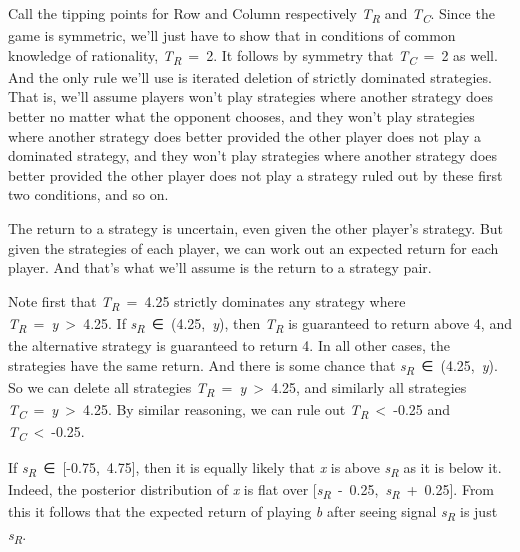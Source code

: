 \documentclass[
  11pt,
  letterpaper,
  DIV=11,
  numbers=noendperiod,
  twoside]{scrartcl}
\begin{document}
Call the tipping points for Row and Column respectively
\emph{T\textsubscript{R}} and \emph{T\textsubscript{C}}. Since the game
is symmetric, we'll just have to show that in conditions of common
knowledge of rationality, \emph{T\textsubscript{R}}~=~2. It follows by
symmetry that \emph{T\textsubscript{C}}~=~2 as well. And the only rule
we'll use is iterated deletion of strictly dominated strategies. That
is, we'll assume players won't play strategies where another strategy
does better no matter what the opponent chooses, and they won't play
strategies where another strategy does better provided the other player
does not play a dominated strategy, and they won't play strategies where
another strategy does better provided the other player does not play a
strategy ruled out by these first two conditions, and so on.

The return to a strategy is uncertain, even given the other player's
strategy. But given the strategies of each player, we can work out an
expected return for each player. And that's what we'll assume is the
return to a strategy pair.

Note first that \emph{T\textsubscript{R}}~=~4.25 strictly dominates any
strategy where \emph{T\textsubscript{R}}~=~\emph{y}~\textgreater~4.25.
If \emph{s\textsubscript{R}}~∈~(4.25,~\emph{y}), then
\emph{T\textsubscript{R}} is guaranteed to return above 4, and the
alternative strategy is guaranteed to return 4. In all other cases, the
strategies have the same return. And there is some chance that
\emph{s\textsubscript{R}}~∈~(4.25,~\emph{y}). So we can delete all
strategies \emph{T\textsubscript{R}}~=~\emph{y}~\textgreater~4.25, and
similarly all strategies
\emph{T\textsubscript{C}}~=~\emph{y}~\textgreater~4.25. By similar
reasoning, we can rule out \emph{T\textsubscript{R}}~\textless~-0.25 and
\emph{T\textsubscript{C}}~\textless~-0.25.

If \emph{s\textsubscript{R}}~∈~{[}-0.75,~4.75{]}, then it is equally
likely that \emph{x} is above \emph{s\textsubscript{R}} as it is below
it. Indeed, the posterior distribution of \emph{x} is flat over
{[}\emph{s\textsubscript{R}}~-~0.25,~\emph{s\textsubscript{R}}~+~0.25{]}.
From this it follows that the expected return of playing \emph{b} after
seeing signal \emph{s\textsubscript{R}} is just
\emph{s\textsubscript{R}}.
\end{document}
